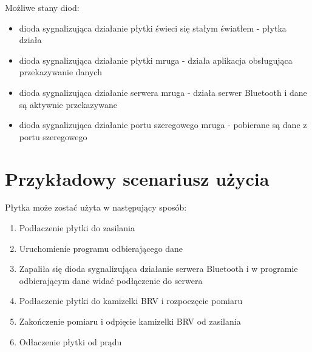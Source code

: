     Możliwe stany diod:
    \begin{itemize}
        \item{dioda sygnalizująca działanie płytki świeci się stałym światłem - płytka działa}
        \item{dioda sygnalizująca działanie płytki mruga - działa aplikacja obsługująca przekazywanie danych}
        \item{dioda sygnalizująca działanie serwera mruga - działa serwer Bluetooth i dane są aktywnie przekazywane}
        \item{dioda sygnalizująca działanie portu szeregowego mruga - pobierane są dane z portu szeregowego}
    \end{itemize}
    \section {Przykładowy scenariusz użycia}
        Płytka może zostać użyta w następujący sposób:
        \begin{enumerate}
            \item{Podłaczenie płytki do zasilania}
            \item{Uruchomienie programu odbierającego dane}
            \item{Zapaliła się dioda sygnalizująca działanie serwera Bluetooth i w programie odbierającym dane widać podłączenie do serwera}
            \item{Podłaczenie płytki do kamizelki BRV i rozpoczęcie pomiaru}
            \item{Zakończenie pomiaru i odpięcie kamizelki BRV od zasilania}
            \item{Odłaczenie płytki od prądu}
        \end{enumerate}
